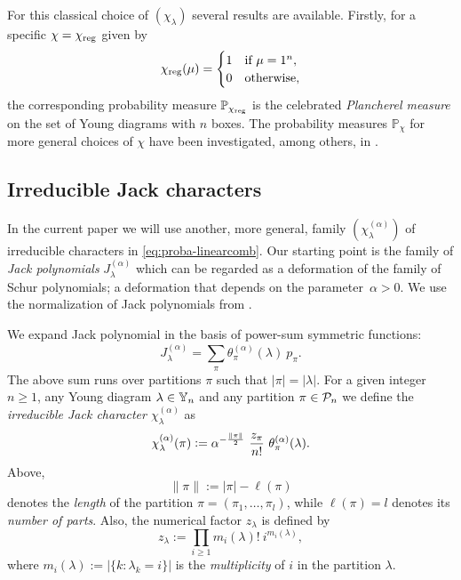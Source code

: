 \documentclass[12pt,usenames,dvipsnames,svgnames,table]{amsart}
\begin{document}
For this classical choice of $(\chi_\lambda)$ several results are available.
Firstly, for a specific $\chi=\chi_{\operatorname{reg}}$ given by
\begin{equation}
\label{eq:regular}
\chi_{\operatorname{reg}}(\mu) = \begin{cases} 1 & \text{if $\mu=1^n$},\\ 0 & \text{otherwise,} \end{cases}    
\end{equation}
the corresponding probability measure $\mathbb{P}_{\chi_{\operatorname{reg}}}$ is the celebrated 
\emph{Plancherel measure} 
\cite{LoganShepp1977,VersikKerov1977,BaikDeiftJohansson1999,Kerov1993gaussian}
on the set of Young diagrams with $n$ boxes.
The probability measures $\mathbb{P}_\chi$ for more 
general choices of $\chi$ have been investigated, among others, in
\cite{Biane1998,Biane2001,Sniady2006c}. 

\subsection{Irreducible Jack characters}
In the current paper we will use another, more general, family $(\chi^{(\alpha)}_\lambda)$ 
of irreducible characters in \eqref{eq:proba-linearcomb}.
Our starting point is the family of \emph{Jack polynomials} $J^{(\alpha)}_\lambda$ 
\cite{Jack1970/1971}
which can be regarded as a deformation of the family of Schur polynomials;
a deformation that depends on the parameter~$\alpha>0$.
We use the normalization of Jack polynomials
from \cite[Section VI.10]{Macdonald1995}.

We expand Jack polynomial in the basis of power-sum symmetric functions:
\begin{equation} 
\label{eq:definition-theta-A}
J^{(\alpha)}_\lambda = \sum_\pi \theta^{(\alpha)}_\pi(\lambda)\ p_\pi. 
\end{equation}
The above sum runs over partitions $\pi$ such that $|\pi|=|\lambda|$. 
For a given integer $n\geq 1$, any Young diagram $\lambda\in\mathbb{Y}_{n}$ and
any partition $\pi\in\mathcal{P}_{n}$
we define the \emph{irreducible Jack character $\chi^{(\alpha)}_\lambda$} as  
\begin{equation}
\label{eq:character-Jack-unnormalized-zmiana}
\chi^{(\alpha)}_\lambda(\pi) :=  \alpha^{-\frac{\|\pi\|}{2}}\ \frac{z_\pi}{n!}\ \theta^{(\a)}_\pi(\lambda).
\end{equation}
Above,
\[ \|\pi\|:=|\pi|-\ell(\pi) \]
denotes the \emph{length} of the partition $\pi=(\pi_1,\dots,\pi_l)$, 
while $\ell(\pi)=l$ denotes its \emph{number of parts}.
Also,
the numerical factor $z_\lambda$ is defined by
\begin{equation}
\label{eq:zlambda}
z_\lambda:= \prod_{i\geq 1} m_i(\lambda)!\ i^{m_i(\lambda)},
\end{equation}
where
$m_i(\lambda):=\big|\{k: \lambda_k=i\}\big|$
is the \emph{multiplicity} of $i$ in the partition $\lambda$.
\end{document}
